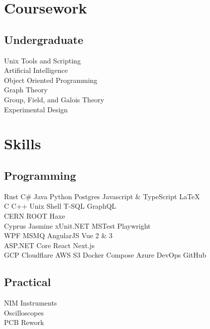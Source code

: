 \documentclass[no-math]{deedy-resume-openfont}
\begin{document}
\begin{minipage}[t]{0.33\textwidth}
		
		\section{Coursework}
		
		\subsection{Undergraduate}
		Unix Tools and Scripting \\
		Artificial Intelligence \\
		Object Oriented Programming \\
		Graph Theory \\
		Group, Field, and Galois Theory \\
		Experimental Design 		
		
		
		\section{Skills}
		\subsection{Programming}
		 Rust \textbullet{} C\# \textbullet{} Java \textbullet{} Python \textbullet{} Postgres \textbullet{} Javascript \& TypeScript \textbullet{} \LaTeX \\ 
		C \textbullet{} C++ \textbullet{} Unix Shell \textbullet{} T-SQL \textbullet GraphQL \\
		CERN ROOT \textbullet{} Haxe \\
		Cyprus \textbullet Jasmine \textbullet xUnit.NET \textbullet MSTest \textbullet Playwright \\
		WPF \textbullet MSMQ  \textbullet AngularJS \textbullet Vue 2 \& 3 \textbullet \\ ASP.NET Core \textbullet React \textbullet Next.js \\
		GCP \textbullet Cloudflare \textbullet AWS S3 \textbullet Docker Compose \textbullet Azure DevOps \textbullet GitHub
		\sectionsep
		
		
		
		\subsection{Practical}
		NIM Instruments \\
		Oscilloscopes \\
		PCB Rework
		
	\end{minipage} 
\end{document}
